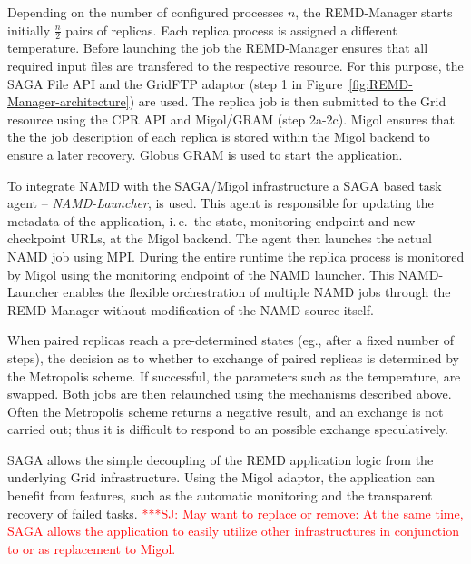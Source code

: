 \documentclass[conference,final]{IEEEtran}
\newcommand{\jhanote}[1]{ {\textcolor{red} { ***SJ: #1 }}}
\newcommand{\jhanote}[1]{}
\begin{document}

Depending on the number of configured processes $n$, the REMD-Manager
starts initially $\frac{n}{2}$ pairs of replicas.  Each replica
process is assigned a different temperature. Before launching the job
the REMD-Manager ensures that all required input files are transfered
to the respective resource. For this purpose, the SAGA File API and
the GridFTP adaptor (step 1 in
Figure~\ref{fig:REMD-Manager-architecture}) are used.  The replica job
is then submitted to the Grid resource using the CPR API and
Migol/GRAM (step 2a-2c). Migol ensures that the the job description of
each replica is stored within the Migol backend to ensure a later
recovery. Globus GRAM is used to start the application.
                                               
To integrate NAMD with the SAGA/Migol infrastructure a SAGA based task
agent -- {\it NAMD-Launcher}, is used.  This agent is responsible for
updating the metadata of the application, i.\,e.\ the state,
monitoring endpoint and new checkpoint URLs, at the
Migol backend.  The agent then launches the actual NAMD job using
MPI. During the entire runtime the replica process is monitored by
Migol using the monitoring endpoint of the NAMD launcher. This
NAMD-Launcher enables the flexible orchestration of multiple NAMD jobs
through the REMD-Manager without modification of the NAMD source
itself.


When paired replicas reach a pre-determined states (eg., after a fixed
number of steps), the decision as to whether to exchange of paired
replicas is determined by the Metropolis scheme. If successful, the
parameters such as the temperature, are swapped. Both jobs are then
relaunched using the mechanisms described above. Often the Metropolis
scheme returns a negative result, and an exchange is not carried out; thus
it is difficult to respond to an possible exchange speculatively.

SAGA allows the simple decoupling of the REMD application logic from
the underlying Grid infrastructure. Using the Migol adaptor, the
application can benefit from features, such as the automatic
monitoring and the transparent recovery of failed tasks.  \jhanote{May
  want to replace or remove: At the same time, SAGA allows the
  application to easily utilize other infrastructures in conjunction
  to or as replacement to Migol.}
\end{document}

